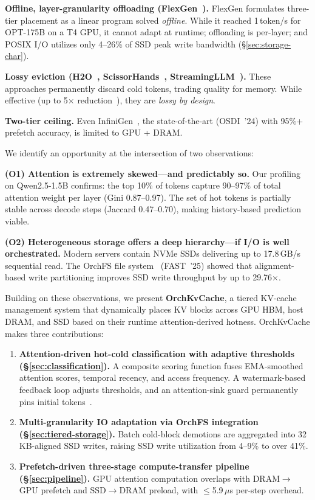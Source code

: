 \documentclass[conference]{IEEEtran}
\begin{document}
\textbf{Offline, layer-granularity offloading (FlexGen~\cite{flexgen}).} FlexGen formulates three-tier placement as a linear program solved \emph{offline}. While it reached 1\,token/s for OPT-175B on a T4 GPU, it cannot adapt at runtime; offloading is per-layer; and POSIX I/O utilizes only 4--26\% of SSD peak write bandwidth (\S\ref{sec:storage-char}).

\textbf{Lossy eviction (H2O~\cite{h2o}, ScissorHands~\cite{scissorhands}, StreamingLLM~\cite{streamingllm}).} These approaches permanently discard cold tokens, trading quality for memory. While effective (up to 5$\times$ reduction~\cite{h2o}), they are \emph{lossy by design}.

\textbf{Two-tier ceiling.} Even InfiniGen~\cite{infinigen}, the state-of-the-art (OSDI~'24) with 95\%+ prefetch accuracy, is limited to GPU + DRAM.

We identify an opportunity at the intersection of two observations:

\textbf{(O1) Attention is extremely skewed---and predictably so.} Our profiling on Qwen2.5-1.5B confirms: the top 10\% of tokens capture 90--97\% of total attention weight per layer (Gini 0.87--0.97). The set of hot tokens is partially stable across decode steps (Jaccard 0.47--0.70), making history-based prediction viable.

\textbf{(O2) Heterogeneous storage offers a deep hierarchy---if I/O is well orchestrated.} Modern servers contain NVMe SSDs delivering up to 17.8\,GB/s sequential read. The OrchFS file system~\cite{orchfs} (FAST~'25) showed that alignment-based write partitioning improves SSD write throughput by up to 29.76$\times$.

Building on these observations, we present \textbf{OrchKvCache}, a tiered KV-cache management system that dynamically places KV blocks across GPU HBM, host DRAM, and SSD based on their runtime attention-derived hotness. OrchKvCache makes three contributions:

\begin{enumerate}
\item \textbf{Attention-driven hot-cold classification with adaptive thresholds (\S\ref{sec:classification}).} A composite scoring function fuses EMA-smoothed attention scores, temporal recency, and access frequency. A watermark-based feedback loop adjusts thresholds, and an attention-sink guard permanently pins initial tokens~\cite{streamingllm}.

\item \textbf{Multi-granularity IO adaptation via OrchFS integration (\S\ref{sec:tiered-storage}).} Batch cold-block demotions are aggregated into 32\,KB-aligned SSD writes, raising SSD write utilization from 4--9\% to over 41\%.

\item \textbf{Prefetch-driven three-stage compute-transfer pipeline (\S\ref{sec:pipeline}).} GPU attention computation overlaps with DRAM$\to$GPU prefetch and SSD$\to$DRAM preload, with $\leq$5.9\,$\mu$s per-step overhead.
\end{enumerate}
\end{document}
